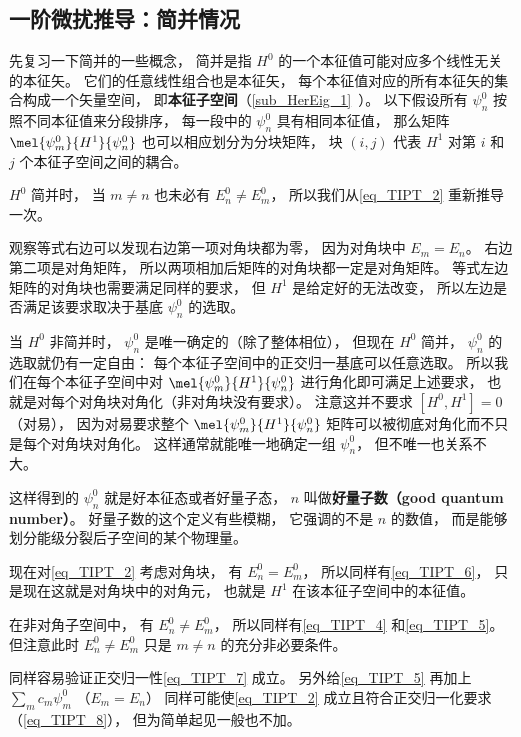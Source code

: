 \subsection{一阶微扰推导：简并情况}
先复习一下简并的一些概念， 简并是指 $H^0$ 的一个本征值可能对应多个线性无关的本征矢。 它们的任意线性组合也是本征矢， 每个本征值对应的所有本征矢的集合构成一个矢量空间， 即\textbf{本征子空间}（\autoref{sub_HerEig_1}~）。 以下假设所有 $\psi_n^0$ 按照不同本征值来分段排序， 每一段中的 $\psi_n^0$ 具有相同本征值， 那么矩阵 $\mel{\psi_m^0}{H^1}{\psi_n^0}$ 也可以相应划分为分块矩阵， 块 $(i,j)$ 代表 $H^1$ 对第 $i$ 和 $j$ 个本征子空间之间的耦合。

$H^0$ 简并时， 当 $m\ne n$ 也未必有 $E_n^0 \ne E_m^0$， 所以我们从\autoref{eq_TIPT_2} 重新推导一次。

观察等式右边可以发现右边第一项对角块都为零， 因为对角块中 $E_m = E_n$。 右边第二项是对角矩阵， 所以两项相加后矩阵的对角块都一定是对角矩阵。 等式左边矩阵的对角块也需要满足同样的要求， 但 $H^1$ 是给定好的无法改变， 所以左边是否满足该要求取决于基底 $\psi_n^0$ 的选取。

当 $H^0$ 非简并时， $\psi_n^0$ 是唯一确定的（除了整体相位）， 但现在 $H^0$ 简并， $\psi_n^0$ 的选取就仍有一定自由： 每个本征子空间中的正交归一基底可以任意选取。 所以我们在每个本征子空间中对 $\mel{\psi_m^0}{H^1}{\psi_n^0}$ 进行角化即可满足上述要求， 也就是对每个对角块对角化（非对角块没有要求）。 注意这并不要求 $[H^0, H^1] = 0$ （对易）， 因为对易要求整个 $\mel{\psi_m^0}{H^1}{\psi_n^0}$ 矩阵可以被彻底对角化而不只是每个对角块对角化。 这样通常就能唯一地确定一组 $\psi_n^0$， 但不唯一也关系不大。

这样得到的 $\psi_n^0$ 就是好本征态或者好量子态， $n$ 叫做\textbf{好量子数（good quantum number）}。 好量子数的这个定义有些模糊， 它强调的不是 $n$ 的数值， 而是能够划分能级分裂后子空间的某个物理量。

现在对\autoref{eq_TIPT_2} 考虑对角块， 有 $E_n^0 = E_m^0$， 所以同样有\autoref{eq_TIPT_6}， 只是现在这就是对角块中的对角元， 也就是 $H^1$ 在该本征子空间中的本征值。

在非对角子空间中， 有 $E_n^0 \ne E_m^0$， 所以同样有\autoref{eq_TIPT_4} 和\autoref{eq_TIPT_5}。 但注意此时 $E_n^0 \ne E_m^0$ 只是 $m \ne n$ 的充分非必要条件。

同样容易验证正交归一性\autoref{eq_TIPT_7} 成立。 另外给\autoref{eq_TIPT_5} 再加上 $\sum_m c_m \psi_m^0$ （$E_m = E_n$） 同样可能使\autoref{eq_TIPT_2} 成立且符合正交归一化要求（\autoref{eq_TIPT_8}）， 但为简单起见一般也不加。


